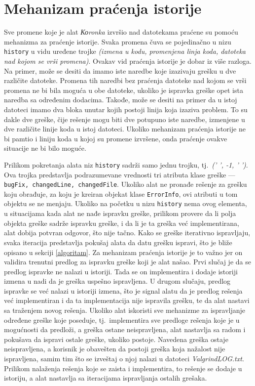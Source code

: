 \documentclass[12pt,oneside]{memoir}
\theoremstyle{plain}
\theoremstyle{definition}
\begin{document}
\section{Mehanizam praćenja istorije}\label{istorija}
Sve promene koje je alat \textit{Коronka} izvršio nad datotekama praćene su pomoću mehanizma za praćenje istorije. Svaka promena čuva se pojedinačno u nizu \texttt{history} u vidu uređene trojke \textit{(izmena u kodu, promenjena linja koda, datoteka nad kojom se vrši promena)}. Ovakav vid praćenja istorije je dobar iz više razloga. Na primer, može se desiti da imamo iste naredbe koje izazivaju grešku u dve različite datoteke. Promena tih naredbi bez praćenja datoteke nad kojom se vrši promena ne bi bila moguća u obe datoteke, ukoliko je ispravka greške opet ista naredba sa određenim dodacima. Takođe, može se desiti na primer da u istoj datoteci imamo dva bloka unutar kojih postoji linija koja izaziva problem. To su dakle dve greške, čije rešenje mogu biti dve potupuno iste naredbe, izmenjene u dve različite linije koda u istoj datoteci. Ukoliko mehanizam praćenja istorije ne bi pamtio i liniju koda u kojoj su promene izvršene, onda praćenje ovakve situacije ne bi bilo moguće.

Prilikom pokretanja alata niz \texttt{history} sadrži samo jednu trojku, tj.~\textit{(' ', -1, ' ')}. Ova trojka predstavlja podrazumevane vrednosti tri atributa klase greške --- \texttt{bugFix, changedLine, changedFile}. Ukoliko alat  ne pronađe rešenje za grešku koju obrađuje, za koju je kreiran objekat klase \texttt{ErrorInfo}, ovi atributi u tom objektu se ne menjaju. Ukoliko na početku u nizu \texttt{history} nema ovog elementa, u situacijama kada alat ne nađe ispravku greške, prilikom provere da li polja objekta greške sadrže ispravku greške, i da li je ta greška već implementirana, alat dobija potvran odgovor, što nije tačno. Kako se greške iterativno ispravljaju, svaka iteracija predstavlja pokušaj alata da datu grešku ispravi, što je bliže opisano u sekciji \ref{algoritam}. Za mehanizam praćenja istorije je to važno jer on validira trenutni predlog za ispravku greške koji je alat našao. Prvi slučaj je da se predlog ispravke ne nalazi u istoriji. Tada se on implementira i dodaje istoriji izmena u nadi da je greška uspešno ispravljena. U drugom slučaju, predlog ispravke se već nalazi u istoriji izmena, što je signal alatu da je predlog rešenja već implementiran i da ta implementacija nije ispravila grešku, te da alat nastavi sa traženjem novog rešenja. Ukoliko alat iskoristi sve mehanizme za ispravljanje određene greške koje poseduje, tj.~implementira sve predloge rešenja koje je u mogućnosti da predloži, a greška ostane neispravljena, alat nastavlja sa radom i pokušava da ispravi ostale greške, ukoliko postoje. Navedena greška ostaje neispravljena, a korisnik je obavešten da postoji greška koja nažalost nije ispravljena, samim tim što se izveštaj o njoj nalazi u datoteci \textit{ValgrindLOG.txt}. Prilikom nalaženja rešenja koje se zaista i implementira, to rešenje se dodaje u istoriju, a alat nastavlja sa iteracijama ispravljanja ostalih grešaka.
\end{document}
